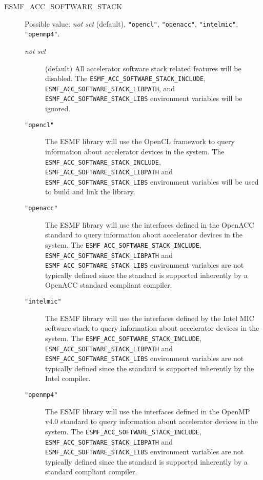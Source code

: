 \begin{description}

\item[ESMF\_ACC\_SOFTWARE\_STACK] Possible value: 
{\it not set} (default), {\tt "opencl"}, {\tt "openacc"},
{\tt "intelmic"}, {\tt "openmp4"}.

\begin{description}
\item[{\it not set}] (default) All accelerator software stack related features
 will be disabled.
The {\tt ESMF\_ACC\_SOFTWARE\_STACK\_INCLUDE}, 
{\tt ESMF\_ACC\_SOFTWARE\_STACK\_LIBPATH}, and
{\tt ESMF\_ACC\_SOFTWARE\_STACK\_LIBS} environment variables will be ignored.

\item[{\tt "opencl"}] The ESMF library will use the OpenCL
framework to query information about accelerator devices in the system.
The {\tt ESMF\_ACC\_SOFTWARE\_STACK\_INCLUDE},
{\tt ESMF\_ACC\_SOFTWARE\_STACK\_LIBPATH} and
{\tt ESMF\_ACC\_SOFTWARE\_STACK\_LIBS} environment variables will be used
to build and link the library.

\item[{\tt "openacc"}] The ESMF library will use the interfaces defined
in the OpenACC standard to query information about accelerator devices 
in the system.
The {\tt ESMF\_ACC\_SOFTWARE\_STACK\_INCLUDE},
{\tt ESMF\_ACC\_SOFTWARE\_STACK\_LIBPATH} and
{\tt ESMF\_ACC\_SOFTWARE\_STACK\_LIBS} environment variables are not typically
defined since the standard is supported inherently by a OpenACC standard
compliant compiler.

\item[{\tt "intelmic"}] The ESMF library will use the interfaces defined
by the Intel MIC software stack to query information about accelerator devices 
in the system.
The {\tt ESMF\_ACC\_SOFTWARE\_STACK\_INCLUDE},
{\tt ESMF\_ACC\_SOFTWARE\_STACK\_LIBPATH} and
{\tt ESMF\_ACC\_SOFTWARE\_STACK\_LIBS} environment variables are not typically
defined since the standard is supported inherently by the Intel compiler.

\item[{\tt "openmp4"}] The ESMF library will use the interfaces defined
in the OpenMP v4.0 standard to query information about accelerator devices 
in the system.
The {\tt ESMF\_ACC\_SOFTWARE\_STACK\_INCLUDE},
{\tt ESMF\_ACC\_SOFTWARE\_STACK\_LIBPATH} and
{\tt ESMF\_ACC\_SOFTWARE\_STACK\_LIBS} environment variables are not typically
defined since the standard is supported inherently by a standard compliant
compiler.


\end{description}
\end{description}
